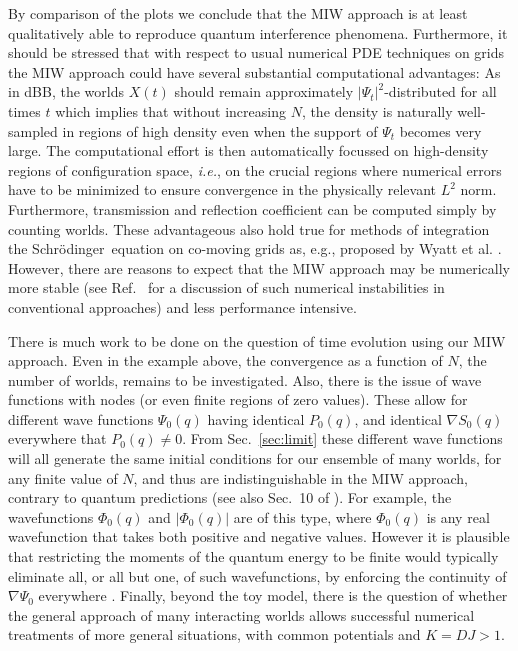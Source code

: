 \documentclass[twocolumn,aps,pra,amsmath,amssymb,superscriptaddress]{revtex4}
\newcommand{\ie}{{\em i.e.}}
\newcommand{\sch}{Schr\"odinger}
\renewcommand{\(}{\left(}
\renewcommand{\)}{\right)}
\newcommand{\blk}{\color{black}}
\newcommand{\blu}{\color{blue}}
\renewcommand\blu{\blk}
\begin{document}
By comparison of the plots we conclude that the MIW approach is at least
qualitatively able \blk to reproduce quantum interference phenomena. Furthermore, it should be
stressed that with respect to usual numerical PDE techniques on grids the MIW
approach
could have several substantial computational advantages: As in dBB,
the worlds ${X}(t)$ should remain approximately $|\Psi_t|^2$-distributed \blk  for all
times $t$ which implies that without increasing $N$, the density is naturally
well-sampled in regions of high density even when the support of
$\Psi_t$ becomes very large. The computational effort is then automatically
focussed on
high-density regions of configuration space, \ie, on the crucial regions where numerical
errors have to be minimized to ensure convergence in the physically relevant $L^2$ norm.
Furthermore, transmission and reflection coefficient can be computed simply by counting
worlds. These advantageous also hold true for methods of integration the \sch\ 
equation on co-moving grids as, e.g., proposed by Wyatt et al. \cite{wyatt}. However,
there are reasons to expect \blk that the MIW approach may be \blk
 numerically more stable (see Ref.~\cite{deckert} for a discussion of such numerical instabilities 
 in conventional approaches) \blk and less performance intensive.
 

 There is much work to be done on the question of time evolution using our 
 MIW approach. Even in the example above, the  convergence 
 as a function of $N$, the number of worlds, remains to be investigated. 
 Also, there is the issue of wave functions 
 with nodes (or even finite regions of zero values). These allow for 
 different wave functions $\Psi_0(q)$ having identical $P_0(q)$, and  identical  $\nabla  S_0(q)$ everywhere that  $P_0(q)\neq 0$.  From  Sec.~\ref{sec:limit}
 these different wave functions will   all generate  the same initial conditions for our 
 ensemble of many worlds,  for any finite value of $N$,   and thus are indistinguishable in the MIW approach,  
 contrary to quantum predictions (see also Sec.~10 of \cite{sebens}). \blu For example,  the wavefunctions $\Phi_0(q)$ and $|\Phi_0(q)|$ are of this type, where  $\Phi_0(q)$ is any real wavefunction that takes both positive and negative values. 
\blk
 However it is plausible that restricting the  moments of the  quantum energy to be finite would  typically  eliminate
 all, or all but one, of such wavefunctions,  by enforcing the continuity of $\nabla \Psi_0$ \blu everywhere \blk \cite{energy1,energy2}.    Finally,  beyond the toy 
 model, there is the question of whether the general approach of many interacting worlds 
allows  successful numerical treatments of  more  general
situations, with common  potentials and $K=DJ>1$. 
\end{document}
